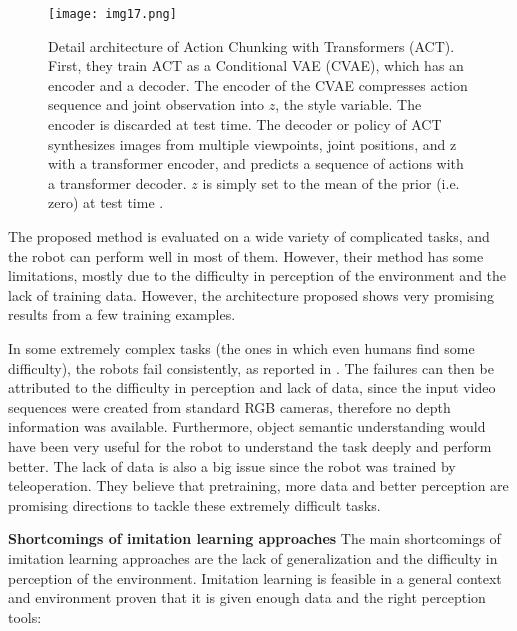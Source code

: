 \begin{figure}[t]
	\centering
	\texttt{[image: img17.png]}
	\captionsetup{width=1\linewidth}
	\caption{Detail architecture of Action Chunking with Transformers (ACT).
		First, they train ACT as a Conditional VAE (CVAE), which has an encoder and a decoder.
		The encoder of the CVAE compresses action sequence and joint observation into $z$, the style variable.
		The encoder is discarded at test time. The decoder or policy of ACT synthesizes images from
		multiple viewpoints, joint positions, and z with a transformer encoder, and
		predicts a sequence of actions with a transformer decoder. $z$ is simply set to the mean of the prior
		(i.e. zero) at test time \cite{tony2023bimanual}.}
	\label{fig:img17}
\end{figure}

The proposed method is evaluated on a wide variety of complicated tasks, and the robot can
perform well in most of them. However, their method has some limitations, mostly due to the
difficulty in perception of the environment and the lack of training data. However, the architecture
proposed shows very promising results from a few training examples.

In some extremely complex tasks (the ones in which even humans find some difficulty),
the robots fail consistently, as reported in \cite{tony2023bimanual}. The failures can then be
attributed to the difficulty in perception and lack of data, since the input video sequences were
created from standard RGB cameras, therefore no depth information was available. Furthermore,
object semantic understanding would have been very useful for the robot to understand the task
deeply and perform better. The lack of data is also a big issue since the robot was trained
by teleoperation. They believe that pretraining, more data and better perception are promising
directions to tackle these extremely difficult tasks.


\textbf{Shortcomings of imitation learning approaches} \quad
The main shortcomings of imitation learning approaches are the lack of generalization and
the difficulty in perception of the environment. Imitation learning is feasible in a general
context and environment proven that it is given enough data and the right perception tools:

